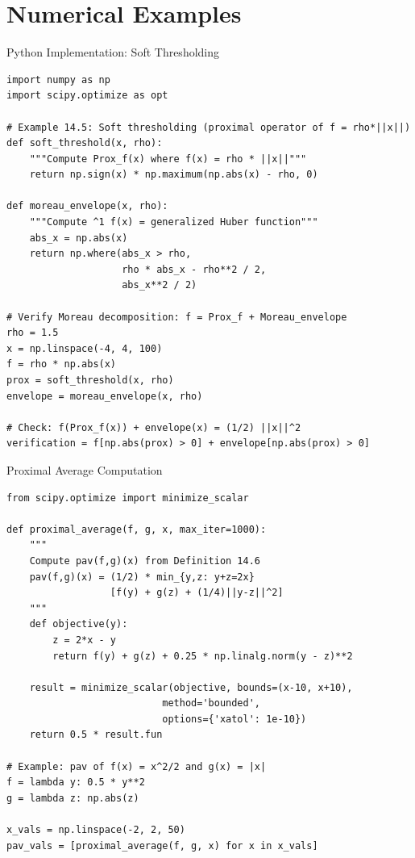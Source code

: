 \documentclass[aspectratio=169,10pt]{beamer}
\begin{document}
\section{Numerical Examples}

\begin{frame}[fragile]{Python Implementation: Soft Thresholding}
  \vspace{-0.3cm}

  \begin{lstlisting}
import numpy as np
import scipy.optimize as opt

# Example 14.5: Soft thresholding (proximal operator of f = rho*||x||)
def soft_threshold(x, rho):
    """Compute Prox_f(x) where f(x) = rho * ||x||"""
    return np.sign(x) * np.maximum(np.abs(x) - rho, 0)

def moreau_envelope(x, rho):
    """Compute ^1 f(x) = generalized Huber function"""
    abs_x = np.abs(x)
    return np.where(abs_x > rho,
                    rho * abs_x - rho**2 / 2,
                    abs_x**2 / 2)

# Verify Moreau decomposition: f = Prox_f + Moreau_envelope
rho = 1.5
x = np.linspace(-4, 4, 100)
f = rho * np.abs(x)
prox = soft_threshold(x, rho)
envelope = moreau_envelope(x, rho)

# Check: f(Prox_f(x)) + envelope(x) = (1/2) ||x||^2
verification = f[np.abs(prox) > 0] + envelope[np.abs(prox) > 0]
  \end{lstlisting}
\end{frame}

\begin{frame}[fragile]{Proximal Average Computation}
  \vspace{-0.3cm}

  \begin{lstlisting}
from scipy.optimize import minimize_scalar

def proximal_average(f, g, x, max_iter=1000):
    """
    Compute pav(f,g)(x) from Definition 14.6
    pav(f,g)(x) = (1/2) * min_{y,z: y+z=2x}
                  [f(y) + g(z) + (1/4)||y-z||^2]
    """
    def objective(y):
        z = 2*x - y
        return f(y) + g(z) + 0.25 * np.linalg.norm(y - z)**2

    result = minimize_scalar(objective, bounds=(x-10, x+10),
                           method='bounded',
                           options={'xatol': 1e-10})
    return 0.5 * result.fun

# Example: pav of f(x) = x^2/2 and g(x) = |x|
f = lambda y: 0.5 * y**2
g = lambda z: np.abs(z)

x_vals = np.linspace(-2, 2, 50)
pav_vals = [proximal_average(f, g, x) for x in x_vals]
  \end{lstlisting}
\end{frame}
\end{document}
